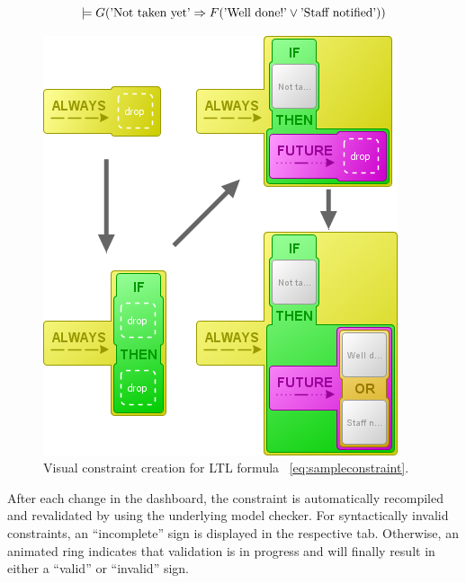 \documentclass[conference]{IEEEtran}
\begin{document}
\begin{equation} \label{eq:sampleconstraint}
  \models G (\textnormal{'Not taken yet'} \Rightarrow F (\textnormal{'Well done!'} \vee \textnormal{'Staff notified'}))
\end{equation}


\begin{figure}[htbp]
  \centering
  \includegraphics[scale=0.4]{sampleconstraint}
  \caption{Visual constraint creation for LTL formula ~\ref{eq:sampleconstraint}.}
  \label{fig:sampleconstraint}
\end{figure}

After each change in the dashboard, the constraint is automatically recompiled and revalidated by using the underlying model checker. For syntactically invalid constraints, an ``incomplete'' sign is displayed in the respective tab. Otherwise, an animated ring indicates that validation is in progress and will finally result in either a ``valid'' or ``invalid'' sign.
\end{document}
